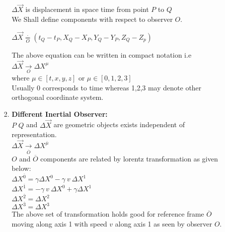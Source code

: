 \documentclass[11pt,a4paper]{article}
\begin{document}
\begin{enumerate}
\begin{enumerate}
\begin{enumerate}
\begin{center}
                        \end{center}
                        $\Delta \vec{X}$ is displacement in space time from point $P$ to $Q$\\
                        We Shall define components with respect to observer $O$.
                        \begin{center}
                            $\Delta \vec{X} \mathop = \limits^{\boldsymbol{\cdot}}_{O} \left(t_Q-t_P,X_Q-X_P,Y_Q-Y_P,Z_Q-Z_p\right)$\\
                        \end{center}
                        The above equation can be written in compact notation i.e\\
                        $\Delta \vec{X} \mathop \rightarrow \limits^{}_{O} \Delta {X^{\mu}}$\\
                        where $\mu \in \left[ t,x,y,z\right]$ or  $\mu \in \left[ 0,1,2,3\right]$\\
                        Usually 0 corresponds to time whereas 1,2,3 may denote other orthogonal coordinate system.\\
                  \item \textbf{Different Inertial Observer:}\\
                        $P$ $Q$ and $\Delta \vec{X}$ are geometric objects exists independent of representation.\\
                        $\Delta \vec{X} \mathop \rightarrow \limits^{}_{\overline{O}} \Delta {X^{\overline{\mu}}}$\\
                        $O$ and $\overline{O}$ components are related by lorentz transformation as given below:\\
                        $\Delta {X^{\overline{0}}}=\gamma {\Delta X^0} - \gamma\ v\ {\Delta X^1}$\\
                        $\Delta {X^{\overline{1}}}=-\gamma\ v\ {\Delta X^0} + \gamma{\Delta X^1}$\\
                        $\Delta {X^{\overline{2}}}={\Delta X^2}$\\
                        $\Delta {X^{\overline{3}}}={\Delta X^3}$\\
                        The above set of transformation holds good for reference frame $\overline{O}$ moving along axis 1 with speed $v$ along axis 1 as seen by observer $O$.\\

\end{enumerate}
\end{enumerate}
\end{enumerate}
\end{document}
